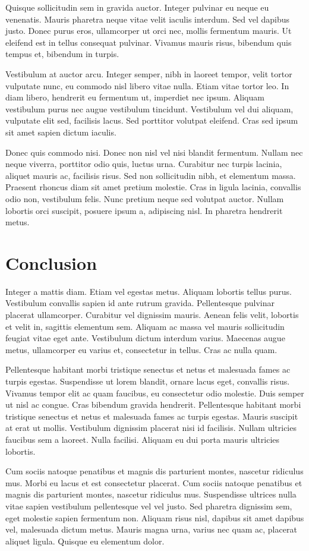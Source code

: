 \documentclass[11pt]{article}
\begin{document}
 Quisque sollicitudin sem in gravida auctor. Integer pulvinar eu neque eu venenatis. Mauris pharetra neque vitae velit iaculis interdum. Sed vel dapibus justo. Donec purus eros, ullamcorper ut orci nec, mollis fermentum mauris. Ut eleifend est in tellus consequat pulvinar. Vivamus mauris risus, bibendum quis tempus et, bibendum in turpis. 

 Vestibulum at auctor arcu. Integer semper, nibh in laoreet tempor, velit tortor vulputate nunc, eu commodo nisl libero vitae nulla. Etiam vitae tortor leo. In diam libero, hendrerit eu fermentum ut, imperdiet nec ipsum. Aliquam vestibulum purus nec augue vestibulum tincidunt. Vestibulum vel dui aliquam, vulputate elit sed, facilisis lacus. Sed porttitor volutpat eleifend. Cras sed ipsum sit amet sapien dictum iaculis. 

 Donec quis commodo nisi. Donec non nisl vel nisi blandit fermentum. Nullam nec neque viverra, porttitor odio quis, luctus urna. Curabitur nec turpis lacinia, aliquet mauris ac, facilisis risus. Sed non sollicitudin nibh, et elementum massa. Praesent rhoncus diam sit amet pretium molestie. Cras in ligula lacinia, convallis odio non, vestibulum felis. Nunc pretium neque sed volutpat auctor. Nullam lobortis orci suscipit, posuere ipsum a, adipiscing nisl. In pharetra hendrerit metus.
 
\section{Conclusion}
Integer a mattis diam. Etiam vel egestas metus. Aliquam lobortis tellus purus. Vestibulum convallis sapien id ante rutrum gravida. Pellentesque pulvinar placerat ullamcorper. Curabitur vel dignissim mauris. Aenean felis velit, lobortis et velit in, sagittis elementum sem. Aliquam ac massa vel mauris sollicitudin feugiat vitae eget ante. Vestibulum dictum interdum varius. Maecenas augue metus, ullamcorper eu varius et, consectetur in tellus. Cras ac nulla quam. 

 Pellentesque habitant morbi tristique senectus et netus et malesuada fames ac turpis egestas. Suspendisse ut lorem blandit, ornare lacus eget, convallis risus. Vivamus tempor elit ac quam faucibus, eu consectetur odio molestie. Duis semper ut nisl ac congue. Cras bibendum gravida hendrerit. Pellentesque habitant morbi tristique senectus et netus et malesuada fames ac turpis egestas. Mauris suscipit at erat ut mollis. Vestibulum dignissim placerat nisi id facilisis. Nullam ultricies faucibus sem a laoreet. Nulla facilisi. Aliquam eu dui porta mauris ultricies lobortis. 

 Cum sociis natoque penatibus et magnis dis parturient montes, nascetur ridiculus mus. Morbi eu lacus et est consectetur placerat. Cum sociis natoque penatibus et magnis dis parturient montes, nascetur ridiculus mus. Suspendisse ultrices nulla vitae sapien vestibulum pellentesque vel vel justo. Sed pharetra dignissim sem, eget molestie sapien fermentum non. Aliquam risus nisl, dapibus sit amet dapibus vel, malesuada dictum metus. Mauris magna urna, varius nec quam ac, placerat aliquet ligula. Quisque eu elementum dolor.
 
\nocite{*}


\end{document}
